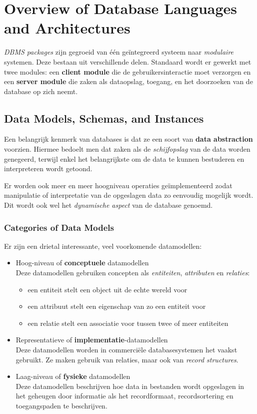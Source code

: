 \chapter{Overview of Database Languages and Architectures}
\textit{DBMS packages} zijn gegroeid van \'e\'en ge\"integreerd systeem naar \textit{modulaire} systemen. Deze bestaan uit verschillende delen. Standaard wordt er gewerkt met twee modules: een \textbf{client module} die de gebruikersinteractie moet verzorgen en een \textbf{server module} die zaken als dataopslag, toegang, en het doorzoeken van de database op zich neemt.


\section{Data Models, Schemas, and Instances}
Een belangrijk kenmerk van databases is dat ze een soort van \textbf{data abstraction} voorzien. Hiermee bedoelt men dat zaken als de \textit{schijfopslag} van de data worden genegeerd, terwijl enkel het belangrijkste om de data te kunnen bestuderen en interpreteren wordt getoond.

Er worden ook meer en meer hoogniveau operaties ge\"implementeerd zodat manipulatie of interpretatie van de opgeslagen data zo eenvoudig mogelijk wordt. Dit wordt ook wel het \textit{dynamische aspect} van de database genoemd.

\subsection{Categories of Data Models}
Er zijn een drietal interessante, veel voorkomende datamodellen:
\begin{itemize}
\item{Hoog-niveau of \textbf{conceptuele} datamodellen}\\
Deze datamodellen gebruiken concepten als \textit{entiteiten}, \textit{attributen} en \textit{relaties}:
\vspace{-2mm}
\begin{itemize}
\item{een entiteit} stelt een object uit de echte wereld voor
\item{een attribuut} stelt een eigenschap van zo een entiteit voor
\item{een relatie} stelt een associatie voor tussen twee of meer entiteiten
\end{itemize}

\item{Representatieve of \textbf{implementatie}-datamodellen}\\
Deze datamodellen worden in commerci\"ele databasesystemen het vaakst gebruikt. Ze maken gebruik van relaties, maar ook van \textit{record structures}.

\item{Laag-niveau of \textbf{fysieke} datamodellen}\\
Deze datamodellen beschrijven hoe data in bestanden wordt opgeslagen in het geheugen door informatie als het recordformaat, recordsortering en toegangspaden te beschrijven.
\end{itemize}

